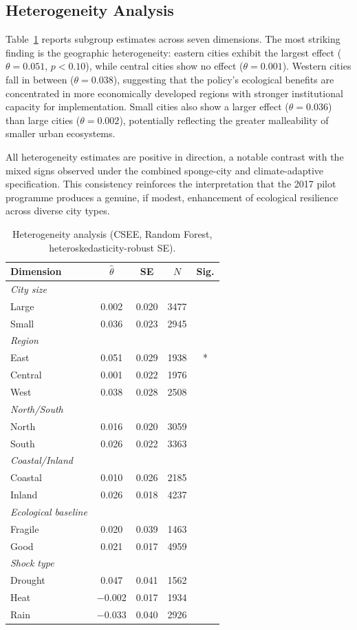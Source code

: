 \subsection{Heterogeneity Analysis}

Table~\ref{tab:heterogeneity} reports subgroup estimates across
seven dimensions. The most striking finding is the geographic
heterogeneity: eastern cities exhibit the largest effect
($\theta = 0.051$, $p < 0.10$), while central cities show no effect
($\theta = 0.001$). Western cities fall in between ($\theta = 0.038$),
suggesting that the policy's ecological benefits are concentrated in
more economically developed regions with stronger institutional
capacity for implementation. Small cities also show a larger effect
($\theta = 0.036$) than large cities ($\theta = 0.002$), potentially
reflecting the greater malleability of smaller urban ecosystems.

All heterogeneity estimates are positive in direction, a notable
contrast with the mixed signs observed under the combined
sponge-city and climate-adaptive specification. This consistency
reinforces the interpretation that the 2017 pilot programme produces
a genuine, if modest, enhancement of ecological resilience across
diverse city types.

\begin{table}[htbp]
\centering
\caption{Heterogeneity analysis (CSEE, Random Forest,
heteroskedasticity-robust SE).}
\label{tab:heterogeneity}
\small
\begin{tabular}{lcccc}
\toprule
Dimension & $\hat{\theta}$ & SE & $N$ & Sig. \\
\midrule
\textit{City size} \\
\quad Large  & 0.002 & 0.020 & 3477 & \\
\quad Small  & 0.036 & 0.023 & 2945 & \\
\textit{Region} \\
\quad East   & 0.051 & 0.029 & 1938 & * \\
\quad Central & 0.001 & 0.022 & 1976 & \\
\quad West   & 0.038 & 0.028 & 2508 & \\
\textit{North/South} \\
\quad North  & 0.016 & 0.020 & 3059 & \\
\quad South  & 0.026 & 0.022 & 3363 & \\
\textit{Coastal/Inland} \\
\quad Coastal & 0.010 & 0.026 & 2185 & \\
\quad Inland  & 0.026 & 0.018 & 4237 & \\
\textit{Ecological baseline} \\
\quad Fragile & 0.020 & 0.039 & 1463 & \\
\quad Good    & 0.021 & 0.017 & 4959 & \\
\textit{Shock type} \\
\quad Drought & 0.047 & 0.041 & 1562 & \\
\quad Heat    & $-$0.002 & 0.017 & 1934 & \\
\quad Rain    & $-$0.033 & 0.040 & 2926 & \\
\bottomrule
\end{tabular}
\end{table}

